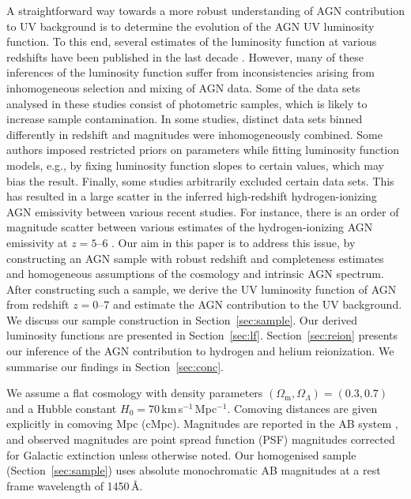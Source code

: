 \documentclass[fleqn,usenatbib]{mnras}
\begin{document}
A straightforward way towards a more robust understanding of AGN
contribution to UV background is to determine the evolution of the AGN
UV luminosity function.  To this end, several estimates of the
luminosity function at various redshifts have been published in the
last decade \citep{2009A&A...507..781S, 2011ApJ...728L..26G,
  2012ApJ...755..169M, 2013ApJ...773...14R, 2013ApJ...768..105M,
  2015AA...578A..83G, 2016ApJ...833..222J, 2016ApJ...829...33Y,
  2017ApJ...847L..15O, 2018PASJ...70S..34A}.  However, many of these
inferences of the luminosity function suffer from inconsistencies
arising from inhomogeneous selection and mixing of AGN data.  Some of
the data sets analysed in these studies consist of photometric
samples, which is likely to increase sample contamination.  In some
studies, distinct data sets binned differently in redshift and
magnitudes were inhomogeneously combined.  Some authors imposed
restricted priors on parameters while fitting luminosity function
models, e.g., by fixing luminosity function slopes to certain values,
which may bias the result.  Finally, some studies arbitrarily excluded
certain data sets.  This has resulted in a large scatter in the
inferred high-redshift hydrogen-ionizing AGN emissivity between
various recent studies.  For instance, there is an order of magnitude
scatter between various estimates of the hydrogen-ionizing AGN
emissivity at $z=5$--$6$ \citep{2011ApJ...728L..26G,
  2012ApJ...755..169M, 2015AA...578A..83G, 2018PASJ...70S..34A,
  2018AJ....155..131M, 2018MNRAS.474.2904P, 2017ApJ...847L..15O}.  Our
aim in this paper is to address this issue, by constructing an AGN
sample with robust redshift and completeness estimates and homogeneous
assumptions of the cosmology and intrinsic AGN spectrum.  After
constructing such a sample, we derive the UV luminosity function of
AGN from redshift $z=0$--$7$ and estimate the AGN contribution to the
UV background.  We discuss our sample construction in
Section~\ref{sec:sample}.  Our derived luminosity functions are
presented in Section~\ref{sec:lf}.  Section~\ref{sec:reion} presents
our inference of the AGN contribution to hydrogen and helium
reionization.  We summarise our findings in Section~\ref{sec:conc}.


We assume a flat cosmology with density parameters
$\left(\Omega_\mathrm{m},\Omega_\Lambda\right)=\left(0.3,0.7\right)$
and a Hubble constant $H_0=70$\,km\,s$^{-1}$\,Mpc$^{-1}$. Comoving
distances are given explicitly in comoving Mpc (cMpc). Magnitudes
are reported in the AB system \citep{1983ApJ...266..713O}, and
observed magnitudes are point spread function (PSF) magnitudes
\citep{2002AJ....123..485S} corrected for Galactic extinction
\citep{1998ApJ...500..525S} unless otherwise noted.
Our homogenised sample (Section~\ref{sec:sample}) uses absolute
monochromatic AB magnitudes at a rest frame wavelength of 1450\,\AA.
\end{document}
